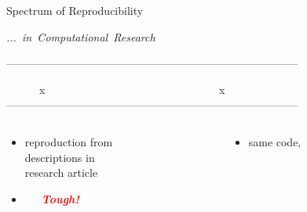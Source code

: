 \documentclass[xcolor=svgnames,11pt]{beamer}
\begin{document}
\begin{frame}{Spectrum of Reproducibility}

\begin{flushright}
  \Large\mbox{\textit{... in Computational Research}}
\end{flushright}
\vspace{0.6cm} \normalsize

--------------------------------------------------------------------------------

\textcolor{white}{---------}x
\textcolor{white}{-----------------------------------------------}x 
--------------------------------------------------------------------------------


\vspace{0.3cm}
\large
\begin{columns}[t]
  \begin{column}[t]{0.5\textwidth} 
    \begin{itemize}
      \item[] reproduction from\\ descriptions in\\ research article
    \end{itemize}
    \vspace{0.2cm}

    \begin{itemize}
      \item[] \textcolor{white}{-----}\Large\textcolor{red}{\textbf{\emph{Tough!}}}
    \end{itemize}

    \large
  \end{column}
  \begin{column}[t]{0.5\textwidth} 
    \begin{itemize}
      \item[] same code,\\ 
        \textcolor{white}{-----}\\ 
    \end{itemize}
    \vspace{0.2cm}


\end{column}
\end{columns}
\end{frame}
\end{document}
